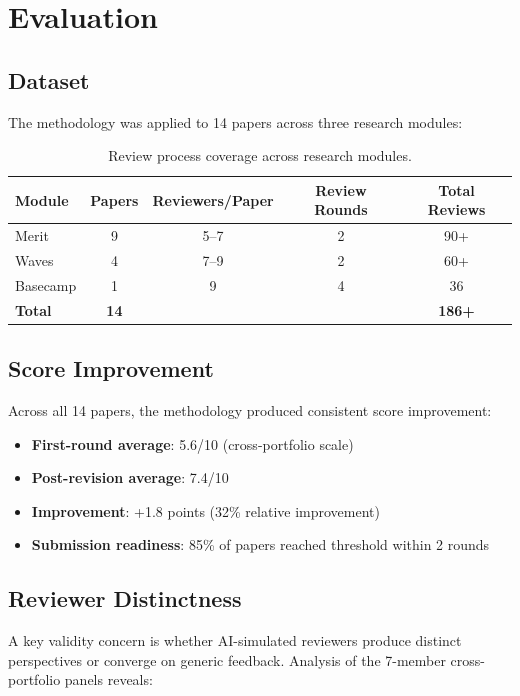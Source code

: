\section{Evaluation}

\subsection{Dataset}

The methodology was applied to 14 papers across three research modules:

\begin{table}[h]
\centering
\small
\begin{tabular}{lcccc}
\toprule
Module & Papers & Reviewers/Paper & Review Rounds & Total Reviews \\
\midrule
Merit & 9 & 5--7 & 2 & 90+ \\
Waves & 4 & 7--9 & 2 & 60+ \\
Basecamp & 1 & 9 & 4 & 36 \\
\midrule
\textbf{Total} & \textbf{14} & & & \textbf{186+} \\
\bottomrule
\end{tabular}
\caption{Review process coverage across research modules.}
\end{table}

\subsection{Score Improvement}

Across all 14 papers, the methodology produced consistent score improvement:

\begin{itemize}
    \item \textbf{First-round average}: 5.6/10 (cross-portfolio scale)
    \item \textbf{Post-revision average}: 7.4/10
    \item \textbf{Improvement}: +1.8 points (32\% relative improvement)
    \item \textbf{Submission readiness}: 85\% of papers reached threshold within 2 rounds
\end{itemize}

\subsection{Reviewer Distinctness}

A key validity concern is whether AI-simulated reviewers produce distinct perspectives or converge on generic feedback. Analysis of the 7-member cross-portfolio panels reveals:


